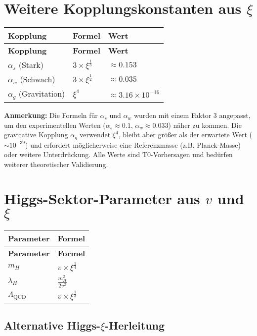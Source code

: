 \documentclass[12pt,a4paper]{article}
\begin{document}
	\section{Weitere Kopplungskonstanten aus \(\xi\)}
	
	\begin{longtable}{|p{3cm}|p{3cm}|p{4cm}|}
		\hline
		\textbf{Kopplung} & \textbf{Formel} & \textbf{Wert} \\
		\hline
		\endfirsthead
		\hline
		\textbf{Kopplung} & \textbf{Formel} & \textbf{Wert} \\
		\hline
		\endhead
		\(\alpha_s\) (Stark) & \(3 \times \xi^{\frac{1}{3}}\) & \(\approx 0.153\) \\
		\hline
		\(\alpha_w\) (Schwach) & \(3 \times \xi^{\frac{1}{2}}\) & \(\approx 0.035\) \\
		\hline
		\(\alpha_g\) (Gravitation) & \(\xi^4\) & \(\approx 3.16 \times 10^{-16}\) \\
		\hline
	\end{longtable}
	
	\textbf{Anmerkung:} Die Formeln für \(\alpha_s\) und \(\alpha_w\) wurden mit einem Faktor 3 angepasst, um den experimentellen Werten (\(\alpha_s \approx 0.1\), \(\alpha_w \approx 0.033\)) näher zu kommen. Die gravitative Kopplung \(\alpha_g\) verwendet \(\xi^4\), bleibt aber größer als der erwartete Wert (\(\sim 10^{-39}\)) und erfordert möglicherweise eine Referenzmasse (z.B. Planck-Masse) oder weitere Unterdrückung. Alle Werte sind T0-Vorhersagen und bedürfen weiterer theoretischer Validierung.
	
	\section{Higgs-Sektor-Parameter aus \( v \) und \(\xi\)}
	
	\begin{longtable}{|p{3cm}|p{4cm}|}
		\hline
		\textbf{Parameter} & \textbf{Formel} \\
		\hline
		\endfirsthead
		\hline
		\textbf{Parameter} & \textbf{Formel} \\
		\hline
		\endhead
		\(m_H\) & \(v \times \xi^{\frac{1}{4}}\) \\
		\hline
		\(\lambda_H\) & \(\frac{m_H^{2}}{2v^{2}}\) \\
		\hline
		\(\Lambda_{\text{QCD}}\) & \(v \times \xi^{\frac{1}{3}}\) \\
		\hline
	\end{longtable}
	
	\subsection{Alternative Higgs-\(\xi\)-Herleitung}
	
\end{document}
